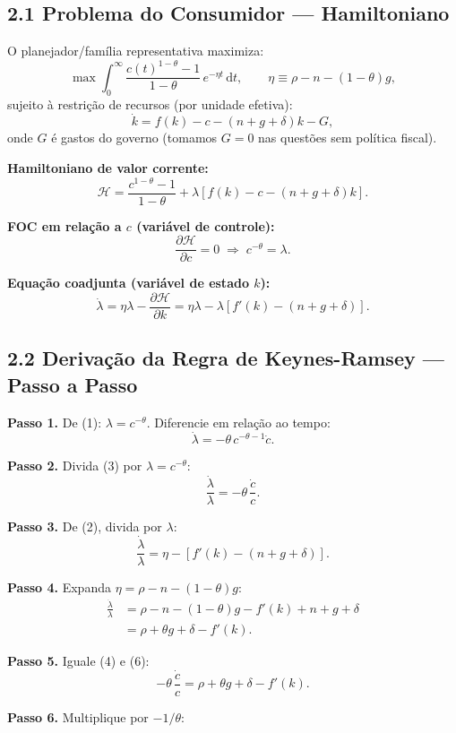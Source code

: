 \documentclass[12pt, a4paper]{article}
\newcommand{\dif}{\mathrm{d}}
\begin{document}
\subsection*{2.1 Problema do Consumidor --- Hamiltoniano}

O planejador/família representativa maximiza:
\[
\max \int_0^\infty \frac{c(t)^{1-\theta}-1}{1-\theta}\,e^{-\eta t}\,\dif t, \qquad \eta \equiv \rho - n - (1-\theta)g,
\]
sujeito à restrição de recursos (por unidade efetiva):
\[
\dot{k} = f(k) - c - (n+g+\delta)k - G,
\]
onde $G$ é gastos do governo (tomamos $G=0$ nas questões sem política fiscal).

\textbf{Hamiltoniano de valor corrente:}
\[
\mathcal{H} = \frac{c^{1-\theta}-1}{1-\theta} + \lambda\!\left[f(k) - c - (n+g+\delta)k\right].
\]

\textbf{FOC em relação a $c$ (variável de controle):}
\[
\frac{\partial\mathcal{H}}{\partial c} = 0 \;\Longrightarrow\; c^{-\theta} = \lambda. \tag{1}
\]

\textbf{Equação coadjunta (variável de estado $k$):}
\[
\dot{\lambda} = \eta\lambda - \frac{\partial\mathcal{H}}{\partial k} = \eta\lambda - \lambda\!\left[f'(k)-(n+g+\delta)\right]. \tag{2}
\]

\subsection*{2.2 Derivação da Regra de Keynes-Ramsey --- Passo a Passo}

\textbf{Passo 1.} De (1): $\lambda = c^{-\theta}$. Diferencie em relação ao tempo:
\[
\dot{\lambda} = -\theta\, c^{-\theta-1}\dot{c}. \tag{3}
\]

\textbf{Passo 2.} Divida (3) por $\lambda = c^{-\theta}$:
\[
\frac{\dot{\lambda}}{\lambda} = -\theta\,\frac{\dot{c}}{c}. \tag{4}
\]

\textbf{Passo 3.} De (2), divida por $\lambda$:
\[
\frac{\dot{\lambda}}{\lambda} = \eta - \!\left[f'(k)-(n+g+\delta)\right]. \tag{5}
\]

\textbf{Passo 4.} Expanda $\eta = \rho - n - (1-\theta)g$:
\begin{align*}
\frac{\dot{\lambda}}{\lambda} &= \rho - n - (1-\theta)g - f'(k) + n + g + \delta\\
&= \rho + \theta g + \delta - f'(k). \tag{6}
\end{align*}

\textbf{Passo 5.} Iguale (4) e (6):
\[
-\theta\,\frac{\dot{c}}{c} = \rho + \theta g + \delta - f'(k).
\]

\textbf{Passo 6.} Multiplique por $-1/\theta$:
\end{document}
